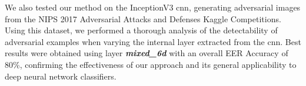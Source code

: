 We also tested our method on the InceptionV3 \gls{cnn}, generating adversarial images from the NIPS 2017 Adversarial Attacks and Defenses Kaggle Competitions.
Using this dataset, we performed a thorough analysis of the detectability of adversarial examples when varying the internal layer extracted from the \gls{cnn}.
Best results were obtained using layer \emph{\textbf{mixed\_6d}} with an overall EER Accuracy of 80\%, confirming the effectiveness of our approach and its general applicability to deep neural network classifiers.

